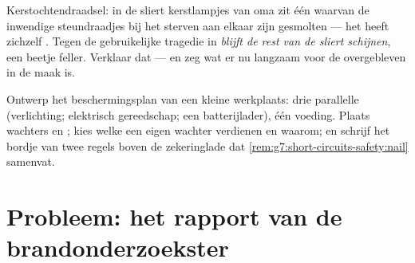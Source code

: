 \begin{exercise}[$\star\star$]\label{exo:g7:short-circuits-safety:11}
Kerstochtendraadsel: in de sliert kerstlampjes van oma  zit
één  waarvan de inwendige steundraadjes bij het sterven aan
elkaar zijn gesmolten --- het heeft zichzelf . Tegen de
gebruikelijke tragedie in \emph{blijft de rest van de sliert
schijnen}, een beetje feller. Verklaar dat --- en zeg wat er nu
langzaam voor de overgebleven  in de maak is.
\end{exercise}

\begin{exercise}[$\star\star\star$]\label{exo:g7:short-circuits-safety:12}
Ontwerp het beschermingsplan van een kleine werkplaats: drie
parallelle  (verlichting; elektrisch gereedschap; een
batterijlader), één voeding. Plaats wachters en
; kies welke  een eigen wachter verdienen en
waarom; en schrijf het bordje van twee regels boven de
zekeringlade dat \cref{rem:g7:short-circuits-safety:nail} samenvat.
\end{exercise}

\section{Probleem: het rapport van de brandonderzoekster}

